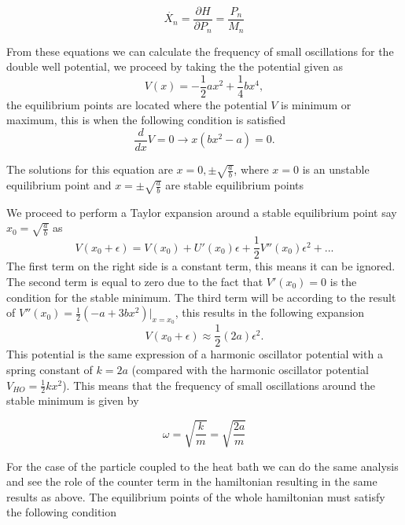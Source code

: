\begin{equation}
\dot{X_n}=\frac{\partial H}{\partial P_n}=\frac{P_n}{M_n}
\end{equation}

From these equations we can calculate the frequency of small oscillations for the double well potential, we proceed by taking the the potential given as
\begin{equation}
V(x)=-\frac{1}{2}ax^2+\frac{1}{4}bx^4,
\label{eq:potential}
\end{equation}
the equilibrium points are located where the potential $V$ is minimum or maximum, this is when the following condition is satisfied
\begin{equation}
\frac{d}{dx}V=0\rightarrow x(bx^2-a) = 0.
\end{equation}

The solutions for this equation are $x=0,\pm \sqrt{\frac{a}{b}}$, where $x=0$ is an unstable equilibrium point and $x=\pm \sqrt{\frac{a}{b}}$ are stable equilibrium points \par 
We proceed to perform a Taylor expansion around a stable equilibrium point say $x_0=\sqrt{\frac{a}{b}}$ as
\begin{equation}
V(x_0 +\epsilon )=V(x_0)+U'(x_0)\epsilon + \frac{1}{2}V''(x_0)\epsilon ^2 + ...
\end{equation}
The first term on the right side is a constant term, this means it can be ignored. The second term is equal to zero due to the fact that $V'(x_0)=0$ is the condition for the stable minimum. The third term will be according to the result of $V''(x_0)=\frac{1}{2}(-a+3bx^2)| _{x=x_0}$, this results in the following expansion
\begin{equation}
V(x_0+\epsilon)\approx \frac{1}{2}(2a)\epsilon ^2.
\end{equation}
This potential is the same expression of a harmonic oscillator potential with a spring constant of $k=2a$ (compared with the harmonic oscillator potential $V_{HO}=\frac{1}{2}kx^2$). This means that the frequency of small oscillations around the stable minimum is given by

\begin{equation}
\omega =\sqrt{\frac{k}{m}}=\sqrt{\frac{2a}{m}}
\label{eq:freq_small_oscillations}
\end{equation}

For the case of the particle coupled to the heat bath we can do the same analysis and see the role of the counter term in the hamiltonian resulting in the same results as above. The equilibrium points of the whole hamiltonian must satisfy the following condition

